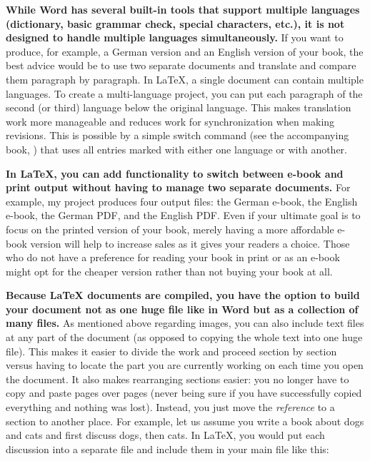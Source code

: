 \textbf{While Word has several built-in tools that support multiple languages (dictionary, basic grammar check, special characters, etc.), it is not designed to handle multiple languages simultaneously.} If you want to produce, for example, a German version and an English version of your book, the best advice would be to use two separate documents and translate and compare them paragraph by paragraph. In LaTeX, a single document can contain multiple languages. To create a multi-language project, you can put each paragraph of the second (or third) language below the original language. This makes translation work more manageable and reduces work for synchronization when making revisions. This is possible by a simple switch command (see the accompanying book, ) that uses all entries marked with either one language or with another. 

\textbf{In LaTeX, you can add functionality to switch between e-book and print output without having to manage two separate documents.} For example, my  project produces four output files: the German e-book, the English e-book, the German PDF, and the English PDF. Even if your ultimate goal is to focus on the printed version of your book, merely having a more affordable e-book version will help to increase sales as it gives your readers a choice. Those who do not have a preference for reading your book in print or as an e-book might opt for the cheaper version rather than not buying your book at all.

\textbf{Because LaTeX documents are compiled, you have the option to build your document not as one huge file like in Word but as a collection of many files.} As mentioned above regarding images, you can also include text files at any part of the document (as opposed to copying the whole text into one huge file). This makes it easier to divide the work and proceed section by section versus having to locate the part you are currently working on each time you open the document. It also makes rearranging sections easier: you no longer have to copy and paste pages over pages (never being sure if you have successfully copied everything and nothing was lost). Instead, you just move the \textit{reference} to a section to another place. For example, let us assume you write a book about dogs and cats and first discuss dogs, then cats. In LaTeX, you would put each discussion into a separate file and include them in your main file like this:

